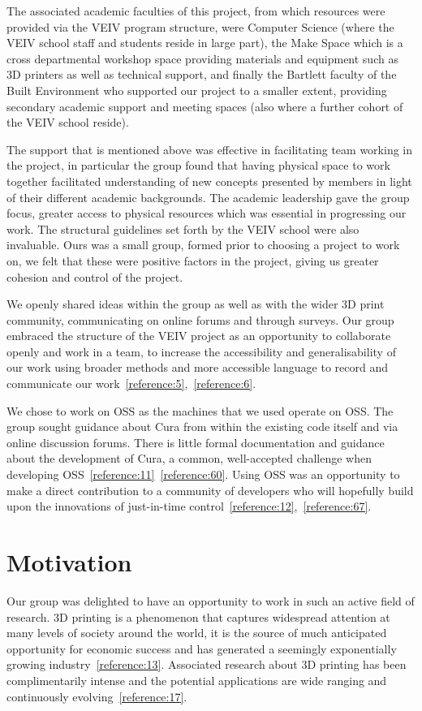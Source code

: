 \documentclass[11pt]{report} %
\begin{document}
The associated academic faculties of this project, from which resources were provided via the VEIV program structure, were Computer Science (where the VEIV school staff and students reside in large part), the Make Space which is a cross departmental workshop space providing materials and equipment such as 3D printers as well as technical support, and finally the Bartlett faculty of the Built Environment who supported our project to a smaller extent, providing secondary academic support and meeting spaces (also where a further cohort of the VEIV school reside).

The support that is mentioned above was effective in facilitating team working in the project, in particular the group found that having physical space to work together facilitated understanding of new concepts presented by members in light of their different academic backgrounds. The academic leadership gave the group focus, greater access to physical resources which was essential in progressing our work. The structural guidelines set forth by the VEIV school were also invaluable. Ours was a small group, formed prior to choosing a project to work on, we felt that these were positive factors in the project, giving us greater cohesion and control of the project. 

We openly shared ideas within the group as well as with the wider 3D print community, communicating on online forums and through surveys. Our group embraced the structure of the VEIV project as an opportunity to collaborate openly and work in a team, to increase the accessibility and generalisability of our work using broader methods and more accessible language to record and communicate our work~\ref{reference:5},~\ref{reference:6}. 

We chose to work on OSS as the machines that we used operate on OSS. The group sought guidance about Cura from within the existing code itself and via online discussion forums. There is little formal documentation and guidance about the development of Cura, a common, well-accepted challenge when developing OSS~\ref{reference:11}~\ref{reference:60}. Using OSS was an opportunity to make a direct contribution to a community of developers who will hopefully build upon the innovations of just-in-time control~\ref{reference:12},~\ref{reference:67}. 





\section{Motivation}
Our group was delighted to have an opportunity to work in such an active field of research. 3D printing is a phenomenon that captures widespread attention at many levels of society around the world, it is the source of much anticipated opportunity for economic success and has generated a seemingly exponentially growing industry~\ref{reference:13}. Associated research about 3D printing has been complimentarily intense and the potential applications are wide ranging and continuously evolving~\ref{reference:17}. 
\end{document}
